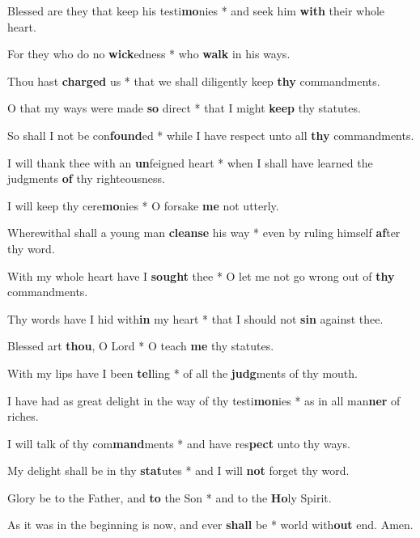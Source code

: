 \begin{multicols}{2}
	Blessed are they that keep his testi\textbf{mo}nies * and seek him \textbf{with} their whole heart.
	
	For they who do no \textbf{wick}edness * who \textbf{walk} in his ways.
	
	Thou hast \textbf{charged} us * that we shall diligently keep \textbf{thy} commandments.
	
	O that my ways were made \textbf{so} direct * that I might \textbf{keep} thy statutes.
	
	So shall I not be con\textbf{found}ed * while I have respect unto all \textbf{thy} commandments.
	
	I will thank thee with an \textbf{un}feigned heart * when I shall have learned the judgments \textbf{of} thy righteousness.
	
	I will keep thy cere\textbf{mo}nies * O forsake \textbf{me} not utterly.
	
	Wherewithal shall a young man \textbf{cleanse} his way * even by ruling himself \textbf{af}ter thy word.
	
	With my whole heart have I \textbf{sought} thee * O let me not go wrong out of \textbf{thy} commandments.
	
	Thy words have I hid with\textbf{in} my heart * that I should not \textbf{sin} against thee.
	
	Blessed art \textbf{thou}, O Lord * O teach \textbf{me} thy statutes.
	
	With my lips have I been \textbf{tel}ling * of all the \textbf{judg}ments of thy mouth.
	
	I have had as great delight in the way of thy testi\textbf{mon}ies * as in all man\textbf{ner} of riches.
	
	I will talk of thy com\textbf{mand}ments * and have res\textbf{pect} unto thy ways.
	
	My delight shall be in thy \textbf{stat}utes * and I will \textbf{not} forget thy word.
	
	Glory be to the Father, and \textbf{to} the Son * and to the \textbf{Ho}ly Spirit.
	
	As it was in the beginning is now, and ever \textbf{shall} be * world with\textbf{out} end. Amen.
\end{multicols}